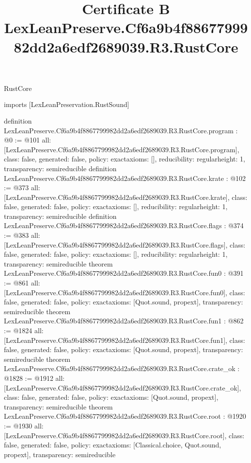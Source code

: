 \begin{lexlean}{RustCore}
\title{Certificate B LexLeanPreserve.Cf6a9b4f8867799982dd2a6edf2689039.R3.RustCore}
\begin{coremodule}
imports [LexLeanPreservation.RustSound]

definition LexLeanPreserve.Cf6a9b4f8867799982dd2a6edf2689039.R3.RustCore.program : @0 := @101 {
  all: [LexLeanPreserve.Cf6a9b4f8867799982dd2a6edf2689039.R3.RustCore.program],
  class: false,
  generated: false,
  policy: exact{axioms: []},
  reducibility: regular{height: 1},
  transparency: semireducible
}
definition LexLeanPreserve.Cf6a9b4f8867799982dd2a6edf2689039.R3.RustCore.krate : @102 := @373 {
  all: [LexLeanPreserve.Cf6a9b4f8867799982dd2a6edf2689039.R3.RustCore.krate],
  class: false,
  generated: false,
  policy: exact{axioms: []},
  reducibility: regular{height: 1},
  transparency: semireducible
}
definition LexLeanPreserve.Cf6a9b4f8867799982dd2a6edf2689039.R3.RustCore.flags : @374 := @383 {
  all: [LexLeanPreserve.Cf6a9b4f8867799982dd2a6edf2689039.R3.RustCore.flags],
  class: false,
  generated: false,
  policy: exact{axioms: []},
  reducibility: regular{height: 1},
  transparency: semireducible
}
theorem LexLeanPreserve.Cf6a9b4f8867799982dd2a6edf2689039.R3.RustCore.fun0 : @391 := @861 {
  all: [LexLeanPreserve.Cf6a9b4f8867799982dd2a6edf2689039.R3.RustCore.fun0],
  class: false,
  generated: false,
  policy: exact{axioms: [Quot.sound, propext]},
  transparency: semireducible
}
theorem LexLeanPreserve.Cf6a9b4f8867799982dd2a6edf2689039.R3.RustCore.fun1 : @862 := @1824 {
  all: [LexLeanPreserve.Cf6a9b4f8867799982dd2a6edf2689039.R3.RustCore.fun1],
  class: false,
  generated: false,
  policy: exact{axioms: [Quot.sound, propext]},
  transparency: semireducible
}
theorem LexLeanPreserve.Cf6a9b4f8867799982dd2a6edf2689039.R3.RustCore.crate_ok : @1828 := @1912 {
  all: [LexLeanPreserve.Cf6a9b4f8867799982dd2a6edf2689039.R3.RustCore.crate_ok],
  class: false,
  generated: false,
  policy: exact{axioms: [Quot.sound, propext]},
  transparency: semireducible
}
theorem LexLeanPreserve.Cf6a9b4f8867799982dd2a6edf2689039.R3.RustCore.root : @1920 := @1930 {
  all: [LexLeanPreserve.Cf6a9b4f8867799982dd2a6edf2689039.R3.RustCore.root],
  class: false,
  generated: false,
  policy: exact{axioms: [Classical.choice, Quot.sound, propext]},
  transparency: semireducible
}


\end{coremodule}
\end{lexlean}
